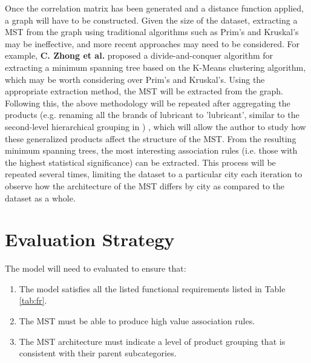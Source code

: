 \documentclass[a4paper,11pt]{article}
\begin{document}
Once the correlation matrix has been generated and a distance function applied, a graph will have to be constructed.  Given the size of the dataset, extracting a MST from the graph using traditional algorithms such as Prim's and Kruskal's may be ineffective, and more recent approaches may need to be considered. For example,  \textbf{C. Zhong et al.} \cite{kmeans_mst} proposed a divide-and-conquer algorithm for extracting a minimum spanning tree based on the K-Means clustering algorithm, which may be worth considering over Prim's and Kruskal's.  Using the appropriate extraction method,  the MST will be extracted from the graph.  Following this, the above methodology will be repeated after aggregating the products (e.g.  renaming all the brands of lubricant to 'lubricant', similar to the second-level hierarchical grouping in \cite{market_ass}) ,  which will allow the author to study how these generalized products affect the structure of the MST. From the resulting minimum spanning trees,  the most interesting association rules (i.e. those with the highest statistical significance) can be extracted.  This process will be repeated several times,  limiting the dataset to a particular city each iteration to observe how the architecture of the MST differs by city as compared to the dataset as a whole.

\newpage
\section{Evaluation Strategy}
The model will need to evaluated to ensure that:
\begin{enumerate}
\item The model satisfies all the listed functional requirements listed in Table \ref{tab:fr}.
\item The MST must be able to produce high value association rules.
\item The MST architecture must indicate a level of product grouping that is consistent with their parent subcategories.
\end{enumerate}
\end{document}
